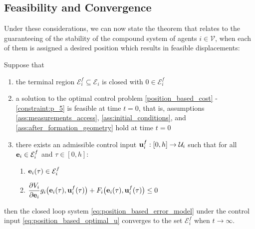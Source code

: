 \subsection{Feasibility and Convergence}

Under these considerations, we can now state the theorem that relates to
the guaranteeing of the stability of the compound system of agents
$i \in \mathcal{V}$, when each of them is assigned a desired
position which results in feasible displacements:\\

\begin{bw_box}
\begin{theorem}

  Suppose that

  \begin{enumerate}
    \item the terminal region $\mathcal{E}_i^f \subseteq \mathcal{E}_i$ is
      closed with $0 \in \mathcal{E}_i^f$
    \item a solution to the optimal control problem \eqref{position_based_cost} -
      \eqref{constraint:p_5} is feasible at time $t=0$, that is, assumptions
      \eqref{ass:measurements_access}, \eqref{ass:initial_conditions}, and
      \eqref{ass:after_formation_geometry} hold at time $t=0$
    \item there exists an admissible control input
      $\bm{\mathbf{u}}_i^f : [0, h] \to \mathcal{U}_i$ such that for all
      $\bm{\mathbf{e}}_i \in \mathcal{E}_i^f$ and $\tau \in [0,h]$:

      \begin{enumerate}
        \item $\bm{\mathbf{e}}_i(\tau) \in \mathcal{E}_i^f$
        \item $\dfrac{\partial V_i}{\partial \bm{\mathbf{e}}_i} g_i\big(\bm{\mathbf{e}}_i(\tau), \bm{\mathbf{u}}_i^f(\tau)\big)
          + F_i\big(\bm{\mathbf{e}}_i(\tau), \bm{\mathbf{u}}_i^f(\tau)\big) \leq 0$
      \end{enumerate}

  \end{enumerate}

  then the closed loop system \eqref{eq:position_based_error_model} under the
  control input \eqref{eq:position_based_optimal_u} converges to the set
  $\mathcal{E}_i^f$ when $t \to \infty$.

\end{theorem}
\end{bw_box}

